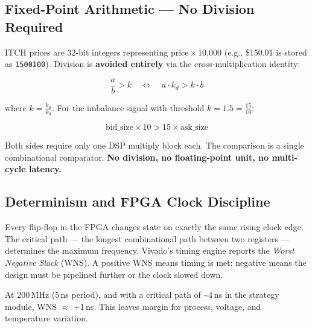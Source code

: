 \documentclass[11pt,a4paper]{article}
\begin{document}
\subsection{Fixed-Point Arithmetic --- No Division Required}

ITCH prices are 32-bit integers representing price\,$\times$\,10{,}000
(e.g., \$150.01 is stored as \texttt{1500100}). Division is \textbf{avoided entirely}
via the cross-multiplication identity:

\[
\frac{a}{b} > k \quad \Longleftrightarrow \quad a \cdot k_d > k \cdot b
\]

\noindent where $k = \frac{k_n}{k_d}$. For the imbalance signal with threshold
$k = 1.5 = \frac{15}{10}$:

\[
\text{bid\_size} \times 10 > 15 \times \text{ask\_size}
\]

\noindent Both sides require only one DSP multiply block each. The comparison
is a single combinational comparator. \textbf{No division, no floating-point unit,
no multi-cycle latency.}

\subsection{Determinism and FPGA Clock Discipline}

Every flip-flop in the FPGA changes state on exactly the same rising clock edge.
The critical path — the longest combinational path between two registers — determines
the maximum frequency. Vivado's timing engine reports the \emph{Worst Negative Slack}
(WNS). A positive WNS means timing is met; negative means the design must be
pipelined further or the clock slowed down.

At 200\,MHz (5\,ns period), and with a critical path of \textasciitilde{}4\,ns in the
strategy module, WNS $\approx$ +1\,ns. This leaves margin for process, voltage,
and temperature variation.
\end{document}
